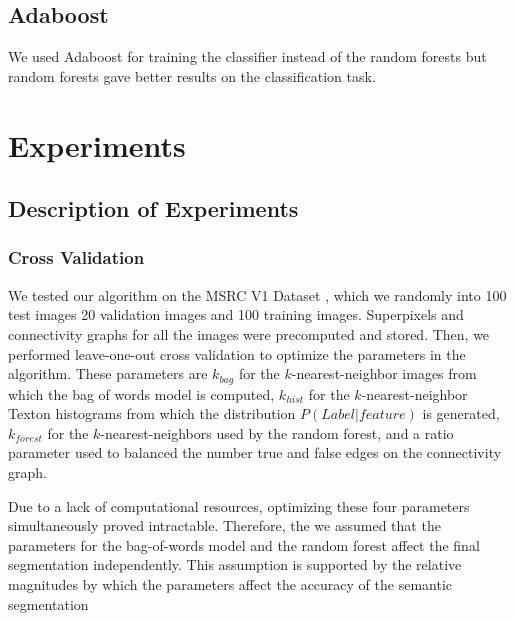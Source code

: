 \documentclass{article} %
\begin{document}
\subsection{Adaboost}
We used Adaboost \cite{Freund96experimentswith} for training the classifier instead of the random forests but random forests gave better results on the classification task. 



\section{Experiments}
\label{sec:Exp}


\subsection{Description of Experiments}
\label{sec:Description}

\subsubsection{Cross Validation}
\label{sec:cross}
We tested our algorithm on the MSRC V1 Dataset \cite{MSRC}, which we randomly into 100 test images 20 validation images and 100 training images.
Superpixels and connectivity graphs for all the images were precomputed and stored.
Then, we performed leave-one-out cross validation to optimize the parameters in the algorithm.
These parameters are $k_{bag}$ for the $k$-nearest-neighbor images from which the bag of words model is computed, $k_{hist}$ for the $k$-nearest-neighbor Texton histograms from which the distribution $P(Label | feature)$ is generated, $k_{forest}$ for the $k$-nearest-neighbors used by the random forest, and a ratio parameter used to balanced the number true and false edges on the connectivity graph. 

Due to a lack of computational resources, optimizing these four parameters simultaneously proved intractable. Therefore, the we assumed that the parameters for the bag-of-words model and the random forest affect the final segmentation independently. This assumption is supported by the relative magnitudes by which the parameters affect the accuracy of the semantic segmentation
\end{document}
